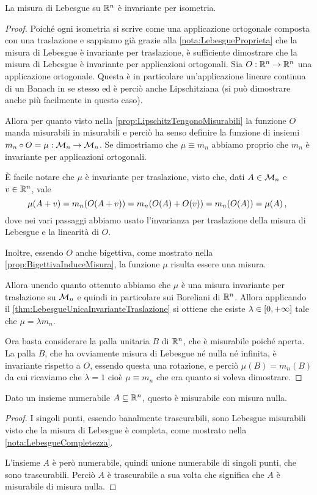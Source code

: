 \begin{proposition}\label{prop:LebesgueProprietaIsometria}
	La misura di Lebesgue su $\mathbb R^n$ è invariante per isometria.
\end{proposition}
\begin{proof}
	Poiché ogni isometria si scrive come una applicazione ortogonale composta con una traslazione e sappiamo già grazie alla \cref{nota:LebesgueProprieta} che la misura di Lebesgue è invariante per traslazione, è sufficiente dimostrare che la misura di Lebesgue è invariante per applicazioni ortogonali.
	Sia $O:\mathbb R^n\to\mathbb R^n$ una applicazione ortogonale. Questa è in particolare un'applicazione lineare continua di un Banach in se stesso ed è perciò anche Lipschitziana (si può dimostrare anche più facilmente in questo caso).
	
	Allora per quanto visto nella \cref{prop:LipschitzTengonoMisurabili} la funzione $O$ manda misurabili in misurabili e perciò ha senso definire la funzione di insiemi $m_n \circ O=\mu:\mathcal M_n\to\mathcal M_n$. 
	Se dimostriamo che $\mu\equiv m_n$ abbiamo proprio che $m_n$ è invariante per applicazioni ortogonali.
	
	È facile notare che $\mu$ è invariante per traslazione, visto che, dati $A\in \mathcal M_n$ e $v\in\mathbb R^n$, vale
	\begin{equation*}
		\mu(A+v)=m_n(O(A+v))=m_n(O(A)+O(v))=m_n(O(A))=\mu(A) \, \text{, }
	\end{equation*}
	dove nei vari passaggi abbiamo usato l'invarianza per traslazione della misura di Lebesgue e la linearità di $O$.
	
	Inoltre, essendo $O$ anche bigettiva, come mostrato nella \cref{prop:BigettivaInduceMisura}, la funzione $\mu$ risulta essere una misura.
	
	Allora unendo quanto ottenuto abbiamo che $\mu$ è una misura invariante per traslazione su $\mathcal M_n$ e quindi in particolare sui Boreliani di $\mathbb R^n$. Allora applicando il \cref{thm:LebesgueUnicaInvarianteTraslazione} si ottiene che esiste $\lambda\in[0,+\infty]$ tale che $\mu=\lambda m_n$.
	
	Ora basta considerare la palla unitaria $B$ di $\mathbb R^n$, che è misurabile poiché aperta.
	La palla $B$, che ha ovviamente misura di Lebesgue né nulla né infinita, è invariante rispetto a $O$, essendo questa una rotazione, e perciò $\mu(B)=m_n(B)$ da cui ricaviamo che $\lambda=1$ cioè $\mu\equiv m_n$ che era quanto si voleva dimostrare.
\end{proof}

\begin{proposition}\label{prop:NumerabiliLebesgueTrascurabili}
	Dato un insieme numerabile $A\subseteq\mathbb R^n$, questo è misurabile con misura nulla.
\end{proposition}
\begin{proof}
	I singoli punti, essendo banalmente trascurabili, sono Lebesgue misurabili visto che la misura di Lebesgue è completa, come mostrato nella \cref{nota:LebesgueCompletezza}.
	
	L'insieme $A$ è però numerabile, quindi unione numerabile di singoli punti, che sono trascurabili. Perciò $A$ è trascurabile a sua volta che significa che $A$ è misurabile di misura nulla.
\end{proof}

